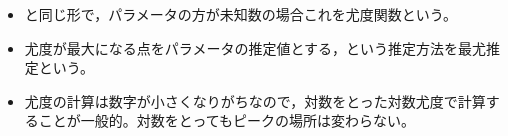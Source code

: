 \begin{itemize}
	\item {}と同じ形で，パラメータの方が未知数の場合これを尤度関数という。
	\item 尤度が最大になる点をパラメータの推定値とする，という推定方法を最尤推定という。
	\item 尤度の計算は数字が小さくなりがちなので，対数をとった対数尤度で計算することが一般的。対数をとってもピークの場所は変わらない。
\end{itemize}
